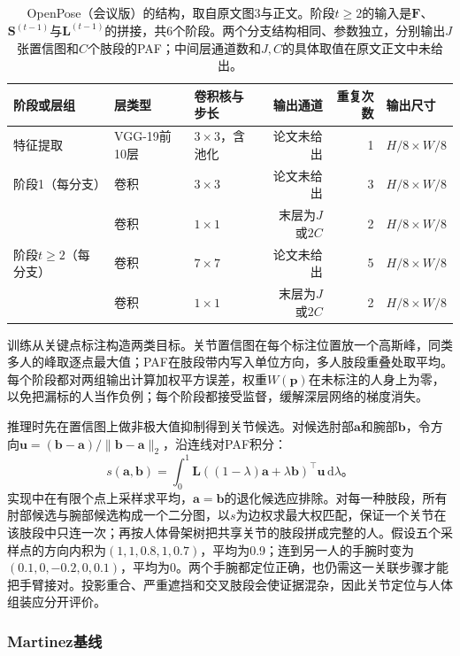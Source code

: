 \begin{table}[tbp]
 \centering
 \small
 \begin{tabular}{@{}lllrrl@{}}
 \toprule
 阶段或层组 & 层类型 & 卷积核与步长 & 输出通道 & 重复次数 & 输出尺寸\\
 \midrule
 特征提取 & VGG-19前10层 & $3\times3$，含池化 & 论文未给出 & 1 & $H/8\times W/8$\\
 阶段1（每分支） & 卷积 & $3\times3$ & 论文未给出 & 3 & $H/8\times W/8$\\
                 & 卷积 & $1\times1$ & 末层为$J$或$2C$ & 2 & $H/8\times W/8$\\
 阶段$t\geq2$（每分支） & 卷积 & $7\times7$ & 论文未给出 & 5 & $H/8\times W/8$\\
                 & 卷积 & $1\times1$ & 末层为$J$或$2C$ & 2 & $H/8\times W/8$\\
 \bottomrule
 \end{tabular}
 \caption{OpenPose（会议版）的结构，取自原文图3与正文。阶段$t\geq2$的输入是$\bm F$、$\bm S^{(t-1)}$与$\bm L^{(t-1)}$的拼接，共6个阶段。两个分支结构相同、参数独立，分别输出$J$张置信图和$C$个肢段的PAF；中间层通道数和$J,C$的具体取值在原文正文中未给出。}
 \label{tab:vision-recognition-openpose-stages}
\end{table}

训练从关键点标注构造两类目标。关节置信图在每个标注位置放一个高斯峰，同类多人的峰取逐点最大值；PAF在肢段带内写入单位方向，多人肢段重叠处取平均。每个阶段都对两组输出计算加权平方误差，权重$W(\bm{p})$在未标注的人身上为零，以免把漏标的人当作负例；每个阶段都接受监督，缓解深层网络的梯度消失。

推理时先在置信图上做非极大值抑制得到关节候选。对候选肘部$\bm{a}$和腕部$\bm{b}$，令方向$\bm{u}=(\bm{b}-\bm{a})/\lVert\bm{b}-\bm{a}\rVert_2$，沿连线对PAF积分：
\begin{equation}
 s(\bm{a},\bm{b})=
 \int_0^1
 \bm{L}((1-\lambda)\bm{a}+\lambda\bm{b})^\top
 \bm{u}\,\mathrm{d}\lambda\text{。}
 \label{eq:vision-paf-score}
\end{equation}
实现中在有限个点上采样求平均，$\bm{a}=\bm{b}$的退化候选应排除。对每一种肢段，所有肘部候选与腕部候选构成一个二分图，以$s$为边权求最大权匹配，保证一个关节在该肢段中只连一次；再按人体骨架树把共享关节的肢段拼成完整的人。假设五个采样点的方向内积为$(1,1,0.8,1,0.7)$，平均为0.9；连到另一人的手腕时变为$(0.1,0,-0.2,0,0.1)$，平均为0。两个手腕都定位正确，也仍需这一关联步骤才能把手臂接对。投影重合、严重遮挡和交叉肢段会使证据混杂，因此关节定位与人体组装应分开评价。

\subsubsection{Martinez基线}
\label{sec:vision-recognition-lifting}

